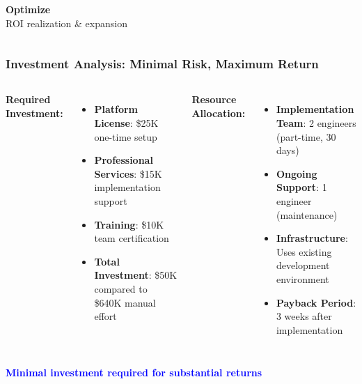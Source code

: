 \begin{frame}
\begin{center}
\begin{columns}
\begin{center}
\colorbox{orange!10}{\parbox{0.9\textwidth}{\centering
\textbf{\textcolor{orange!80}{Optimize}}\\
{\footnotesize ROI realization \& expansion}
}}
\end{center}
\end{columns}

\end{center}
\end{frame}

\begin{frame}
\frametitle{Investment Analysis: Minimal Risk, Maximum Return}
\begin{columns}
\textbf{Required Investment:}
\begin{itemize}
    \item \textbf{Platform License}: \$25K one-time setup
    \item \textbf{Professional Services}: \$15K implementation support
    \item \textbf{Training}: \$10K team certification
    \item \textbf{Total Investment}: \$50K compared to \$640K manual effort
\end{itemize}

\textbf{Resource Allocation:}
\begin{itemize}
    \item \textbf{Implementation Team}: 2 engineers (part-time, 30 days)
    \item \textbf{Ongoing Support}: 1 engineer (maintenance)
    \item \textbf{Infrastructure}: Uses existing development environment
    \item \textbf{Payback Period}: 3 weeks after implementation
\end{itemize}
\end{columns}

\vspace{0.3cm}
\begin{center}
\textcolor{blue}{\textbf{Minimal investment required for substantial returns}}
\end{center}
\end{frame}

